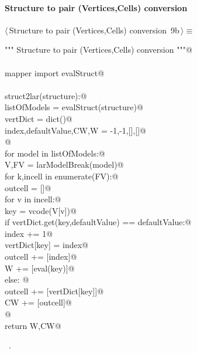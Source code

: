 \documentclass[11pt,oneside]{article}	%
\begin{document}
\paragraph{Structure to pair (Vertices,Cells) conversion}
\begin{flushleft} \small \label{scrap25}
\protect{}$\langle\,$Structure to pair (Vertices,Cells) conversion\nobreak\ {\footnotesize 9b}$\,\rangle\equiv$
\vspace{-1ex}
\begin{list}{}{} \item
\mbox{}\verb@""" Structure to pair (Vertices,Cells) conversion """@\\
\mbox{}\verb@@\\
\mbox{}\verb@from mapper import evalStruct@\\
\mbox{}\verb@@\\
\mbox{}\verb@def struct2lar(structure):@\\
\mbox{}\verb@   listOfModels = evalStruct(structure)@\\
\mbox{}\verb@   vertDict = dict()@\\
\mbox{}\verb@   index,defaultValue,CW,W = -1,-1,[],[]@\\
\mbox{}\verb@      @\\
\mbox{}\verb@   for model in listOfModels:@\\
\mbox{}\verb@      V,FV = larModelBreak(model)@\\
\mbox{}\verb@      for k,incell in enumerate(FV):@\\
\mbox{}\verb@         outcell = []@\\
\mbox{}\verb@         for v in incell:@\\
\mbox{}\verb@            key = vcode(V[v])@\\
\mbox{}\verb@            if vertDict.get(key,defaultValue) == defaultValue:@\\
\mbox{}\verb@               index += 1@\\
\mbox{}\verb@               vertDict[key] = index@\\
\mbox{}\verb@               outcell += [index]@\\
\mbox{}\verb@               W += [eval(key)]@\\
\mbox{}\verb@            else: @\\
\mbox{}\verb@               outcell += [vertDict[key]]@\\
\mbox{}\verb@         CW += [outcell]@\\
\mbox{}\verb@         @\\
\mbox{}\verb@   return W,CW@\\
\mbox{}\verb@@{\NWsep}
\end{list}
\vspace{-1ex}
\footnotesize\addtolength{\baselineskip}{-1ex}
\begin{list}{}{\setlength{\itemsep}{-\parsep}\setlength{\itemindent}{-\leftmargin}}
\item \NWtxtMacroRefIn\ .
\end{list}
\end{flushleft}





\end{document}
